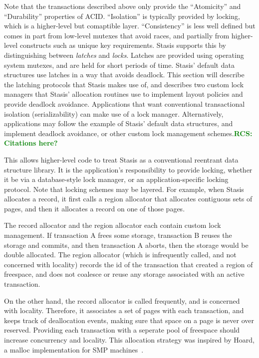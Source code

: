 \documentclass[letterpaper,twocolumn,10pt]{article}
\newcommand{\yad}{Stasis\xspace}
\newcommand{\yads}{Stasis'\xspace}
\newcommand{\rcs}[1]{\textcolor{green}{\bf RCS: #1}}
\begin{document}
Note that the transactions described above only provide the
``Atomicity'' and ``Durability'' properties of ACID.  ``Isolation'' is
typically provided by locking, which is a higher-level but
comaptible layer.  ``Consistency'' is less well defined but comes in
part from low-level mutexes that avoid races, and partially from
higher-level constructs such as unique key requirements.  \yad
supports this by distinguishing between {\em latches} and {\em locks}.
Latches are provided using operating system mutexes, and are held for
short periods of time.  \yads default data structures use latches in a
way that avoids deadlock.  This section will describe the latching
protocols that \yad makes use of, and describes two custom lock
managers that \yads allocation routines use to implement layout 
policies and provide deadlock avoidance.  Applications that want
conventional transactional isolation (serializability) can make 
use of a lock manager.  Alternatively, applications may follow 
the example of \yads default data structures, and implement 
deadlock avoidance, or other custom lock management schemes.\rcs{Citations here?}

This allows higher-level code to treat \yad as a conventional
reentrant data structure library.  It is the application's
responsibility to provide locking, whether it be via a database-style
lock manager, or an application-specific locking protocol.  Note that
locking schemes may be layered.  For example, when \yad allocates a
record, it first calls a region allocator that allocates contiguous
sets of pages, and then it allocates a record on one of those pages.

The record allocator and the region allocator each contain custom lock
management.  If transaction A frees some storage, transaction B reuses
the storage and commits, and then transaction A aborts, then the
storage would be double allocated.  The region allocator (which is
infrequently called, and not concerned with locality) records the id
of the transaction that created a region of freespace, and does not
coalesce or reuse any storage associated with an active transaction.

On the other hand, the record allocator is called frequently, and is
concerned with locality.  Therefore, it associates a set of pages with
each transaction, and keeps track of deallocation events, making sure
that space on a page is never over reserved.  Providing each
transaction with a seperate pool of freespace should increase
concurrency and locality.  This allocation strategy was inspired by
Hoard, a malloc implementation for SMP machines~\cite{hoard}.
\end{document}
